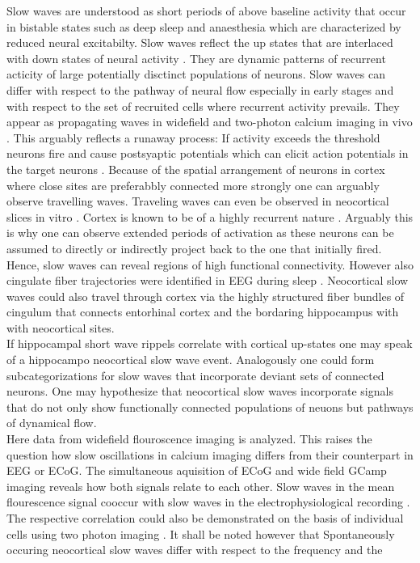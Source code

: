 Slow waves are understood as short periods of above baseline activity that occur in bistable states such as deep sleep and anaesthesia which are characterized by reduced neural excitabilty. Slow waves reflect the up states that are interlaced with down states of neural activity \parencite{jercog2017up}. They are dynamic patterns of recurrent acticity of large potentially disctinct populations of neurons. Slow waves can differ with respect to the pathway of neural flow especially in early stages and with respect to the set of recruited cells where recurrent activity prevails. They appear as propagating waves in widefield and two-photon calcium imaging in vivo \parencite{celotto2020analysis, niethard2018cortical}. This arguably reflects a runaway process: If activity exceeds the threshold neurons fire and cause postsyaptic potentials which can elicit action potentials in the target neurons \parencite{nghiem2018two}. Because of the spatial arrangement of neurons in cortex where close sites are preferabbly connected more strongly one can arguably observe travelling waves. Traveling waves can even be observed in neocortical slices in vitro \parencite{wu2008propagating}. Cortex is known to be of a highly recurrent nature \parencite{guamuanuct2017mouse}. Arguably this is why one can observe extended periods of activation as these neurons can be assumed to directly or indirectly project back to the one that initially fired. Hence, slow waves can reveal regions of high functional connectivity. However also cingulate fiber trajectories were identified in EEG during sleep \parencite{murphy2009source}. Neocortical slow waves could also travel through cortex via the highly structured fiber bundles of cingulum that connects entorhinal cortex and the bordaring hippocampus with with neocortical sites.\\
 If hippocampal short wave rippels correlate with cortical up-states one may speak of a hippocampo neocortical slow wave event. Analogously one could form subcategorizations for slow waves that incorporate deviant sets of connected neurons. One may hypothesize that neocortical slow waves incorporate signals that do not only show functionally connected populations of neuons but pathways of dynamical flow.\\
Here data from widefield flouroscence imaging is analyzed. This raises the question how slow oscillations in calcium imaging differs from their counterpart in EEG or ECoG. The simultaneous aquisition of ECoG and wide field GCamp imaging reveals how both signals relate to each other. Slow waves in the mean flourescence signal cooccur with slow waves in the electrophysiological recording \parencite{stroh2013making}. The respective correlation could also be demonstrated on the basis of individual cells using two photon imaging \parencite{niethard2018cortical}. It shall be noted however that Spontaneously occuring neocortical slow waves differ with respect to the frequency and the
